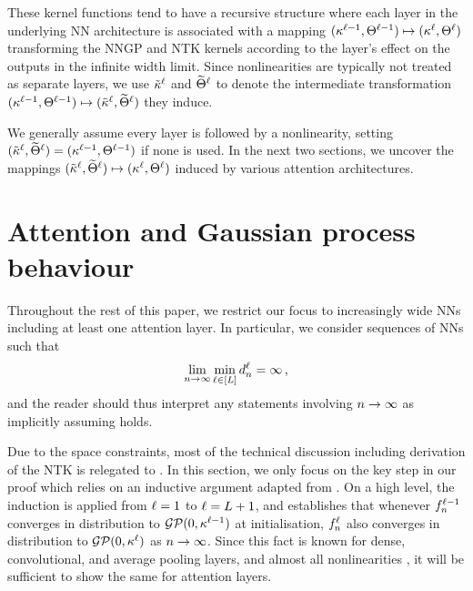 \documentclass{article}
\begin{document}
These kernel functions tend to have a recursive structure where each layer in the underlying NN architecture is associated with a mapping $(\kappa^{\ell - 1}, \Theta^{\ell - 1}) \mapsto (\kappa^{\ell}, \Theta^{\ell})$ transforming the NNGP and NTK kernels according to the layer's effect on the outputs in the infinite width limit.
Since nonlinearities are typically not treated as separate layers, we use $\tilde{\kappa}^{\ell}$ and $\widetilde{\Theta}^{\ell}$ to denote the intermediate transformation $(\kappa^{\ell - 1}, \Theta^{\ell - 1}) \mapsto (\tilde{\kappa}^{\ell}, \widetilde{\Theta}^{\ell})$ they induce.

We generally assume every layer is followed by a nonlinearity, setting $(\tilde{\kappa}^{\ell}, \widetilde{\Theta}^{\ell}) = (\kappa^{\ell-1}, \Theta^{\ell-1})$ if none is used.
In the next two sections,
we uncover the mappings $(\tilde{\kappa}^{\ell}, \widetilde{\Theta}^{\ell}) \mapsto (\kappa^{\ell}, \Theta^{\ell})$ induced by various attention architectures.



\section{Attention and Gaussian process behaviour}\label{sect:theory}

Throughout the rest of this paper, we restrict our focus to increasingly wide NNs including at least one attention layer.
In particular, we consider sequences of NNs such that
\begin{align}\label{eq:sim_limit}
    \lim_{n \to \infty} \min_{\ell \in [L]} d_{n}^{\ell} = \infty
    \, ,
\end{align}
and the reader should thus interpret any statements involving $n \to \infty$ as implicitly assuming
 holds.


Due to the space constraints, most of the technical discussion including derivation of the NTK is relegated to .
In this section, we only focus on the key step in our proof which relies on an inductive argument adapted from \citep{matthews2018gaussian}.
On a high level, the induction is applied from $\ell = 1$ to $\ell = L + 1$, and establishes that whenever 
$f_{n}^{\ell - 1}$ converges in distribution to 
$\mathcal{GP}(0 ,\kappa^{\ell - 1})$ at initialisation, $f_{n}^{\ell}$ also converges in distribution to $\mathcal{GP}(0 ,\kappa^{\ell})$ as $n \to \infty$.
Since this fact is known for dense, convolutional, and average pooling layers, and almost all nonlinearities \citep{matthews2018gaussian,lee2018deep,garriga2019deep,novak2019bayesian,yang2019v2}, it will be sufficient to show the same for attention layers.
\end{document}
